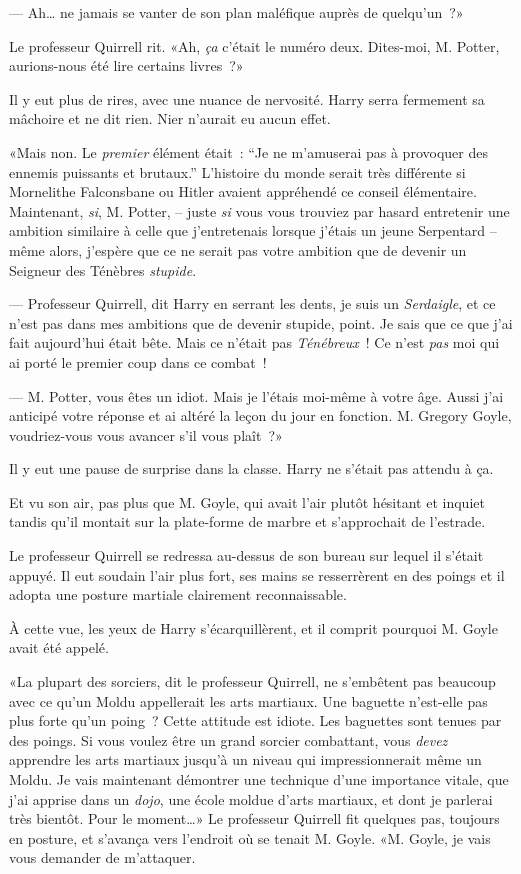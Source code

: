 --- Ah… ne jamais se vanter de son plan maléfique auprès de quelqu'un~?»

Le professeur Quirrell rit. «Ah, \emph{ça} c'était le numéro deux. Dites-moi, M. Potter, aurions-nous été lire certains livres~?»

Il y eut plus de rires, avec une nuance de nervosité. Harry serra fermement sa mâchoire et ne dit rien. Nier n'aurait eu aucun effet.

«Mais non. Le \emph{premier} élément était~: “Je ne m'amuserai pas à provoquer des ennemis puissants et brutaux.” L'histoire du monde serait très différente si Mornelithe Falconsbane ou Hitler avaient appréhendé ce conseil élémentaire. Maintenant, \emph{si}, M. Potter, -- juste \emph{si} vous vous trouviez par hasard entretenir une ambition similaire à celle que j'entretenais lorsque j'étais un jeune Serpentard -- même alors, j'espère que ce ne serait pas votre ambition que de devenir un Seigneur des Ténèbres \emph{stupide}.

--- Professeur Quirrell, dit Harry en serrant les dents, je suis un \emph{Serdaigle}, et ce n'est pas dans mes ambitions que de devenir stupide, point. Je sais que ce que j'ai fait aujourd'hui était bête. Mais ce n'était pas \emph{Ténébreux}~! Ce n'est \emph{pas} moi qui ai porté le premier coup dans ce combat~!

--- M. Potter, vous êtes un idiot. Mais je l'étais moi-même à votre âge. Aussi j'ai anticipé votre réponse et ai altéré la leçon du jour en fonction. M. Gregory Goyle, voudriez-vous vous avancer s'il vous plaît~?»

Il y eut une pause de surprise dans la classe. Harry ne s'était pas attendu à ça.

Et vu son air, pas plus que M. Goyle, qui avait l'air plutôt hésitant et inquiet tandis qu'il montait sur la plate-forme de marbre et s'approchait de l'estrade.

Le professeur Quirrell se redressa au-dessus de son bureau sur lequel il s'était appuyé. Il eut soudain l'air plus fort, ses mains se resserrèrent en des poings et il adopta une posture martiale clairement reconnaissable.

À cette vue, les yeux de Harry s'écarquillèrent, et il comprit pourquoi M. Goyle avait été appelé.

«La plupart des sorciers, dit le professeur Quirrell, ne s'embêtent pas beaucoup avec ce qu'un Moldu appellerait les arts martiaux. Une baguette n'est-elle pas plus forte qu'un poing~? Cette attitude est idiote. Les baguettes sont tenues par des poings. Si vous voulez être un grand sorcier combattant, vous \emph{devez} apprendre les arts martiaux jusqu'à un niveau qui impressionnerait même un Moldu. Je vais maintenant démontrer une technique d'une importance vitale, que j'ai apprise dans un \emph{dojo}, une école moldue d'arts martiaux, et dont je parlerai très bientôt. Pour le moment…» Le professeur Quirrell fit quelques pas, toujours en posture, et s'avança vers l'endroit où se tenait M. Goyle. «M. Goyle, je vais vous demander de m'attaquer.

